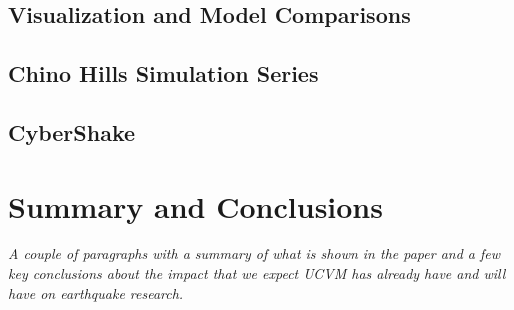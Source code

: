\subsection{Visualization and Model Comparisons}

\subsection{Chino Hills Simulation Series}

\subsection{CyberShake}

\section{Summary and Conclusions}
\label{sec:conclusions}

\textit{
\color{blue}
A couple of paragraphs with a summary of what is shown in the paper and a few key conclusions about the impact that we expect UCVM has already have and will have on earthquake research.
}

